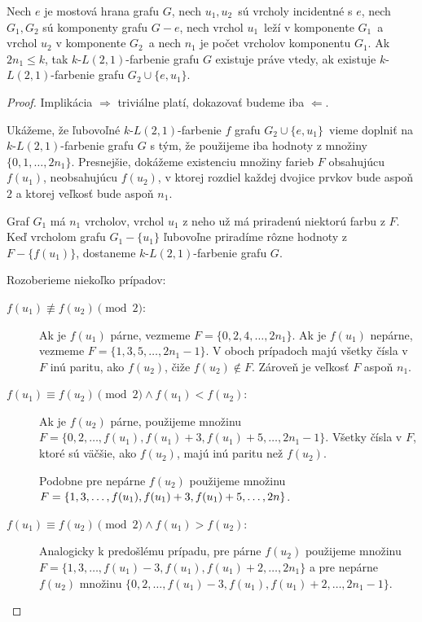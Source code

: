 \begin{lema}
    Nech $e$ je mostová hrana grafu $G$, nech $u_1, u_2$ sú vrcholy incidentné s $e$,
    nech $G_1, G_2$ sú komponenty grafu $G - e$, nech vrchol $u_1$ leží v komponente $G_1$ a vrchol $u_2$
    v komponente $G_2$ a
    nech $n_1$ je počet vrcholov komponentu $G_1$. Ak $2n_1 \leq k$, tak $k$-$L(2,1)$-farbenie
    grafu $G$ existuje práve vtedy, ak existuje $k$-$L(2,1)$-farbenie grafu $G_2 \cup \{e, u_1\}$.
\end{lema}

\begin{proof}
    Implikácia $\boxed{\Rightarrow}$ triviálne platí, dokazovať budeme iba $\boxed{\Leftarrow}$.

    Ukážeme, že ľubovoľné $k$-$L(2,1)$-farbenie $f$ grafu $G_2 \cup \{e, u_1\}$ vieme doplniť na
    $k$-$L(2,1)$-farbenie grafu $G$ s tým, že použijeme iba hodnoty z množiny $\{0, 1, \ldots, 2n_1\}$.
    Presnejšie, dokážeme existenciu množiny farieb $F$ obsahujúcu $f(u_1)$, neobsahujúcu $f(u_2)$,
    v ktorej rozdiel každej dvojice prvkov bude aspoň $2$ a ktorej veľkosť bude aspoň $n_1$.
    
    Graf $G_1$ má $n_1$ vrcholov, vrchol $u_1$ z neho už má priradenú niektorú farbu z $F$. Keď vrcholom
    grafu $G_1 - \{u_1\}$ ľubovoľne priradíme rôzne hodnoty z $F - \{f(u_1)\}$, dostaneme $k$-$L(2,1)$-farbenie
    grafu $G$.

    Rozoberieme niekoľko prípadov:

    \begin{description}
        \item[$\boxed{f(u_1) \not\equiv f(u_2) \pmod{2}}:$] 
            Ak je $f(u_1)$ párne, vezmeme $F = \{0, 2, 4, \ldots, 2n_1\}$.
            Ak je $f(u_1)$ nepárne, vezmeme $F = \{1, 3, 5, \ldots, 2n_1 - 1\}$. V oboch prípadoch majú všetky
            čísla v $F$ inú paritu, ako $f(u_2)$, čiže $f(u_2) \notin F$. Zároveň je veľkosť $F$ aspoň $n_1$.

        \item[$\boxed{f(u_1) \equiv f(u_2) \pmod{2} \wedge f(u_1) < f(u_2)}:$]
            Ak je $f(u_2)$ párne, použijeme množinu
            $F = \{0, 2, \ldots, f(u_1), f(u_1) + 3, f(u_1) + 5, \ldots, 2n_1 - 1\}$. Všetky čísla v $F$, ktoré sú
            väčšie, ako $f(u_2)$, majú inú paritu než $f(u_2)$.

            Podobne pre nepárne $f(u_2)$ použijeme množinu $F = \{1, 3, \ldots, f(u_1), f(u_1) + 3, \\ f(u_1) + 5, \ldots, 2n\}$.

        \item[$\boxed{f(u_1) \equiv f(u_2) \pmod{2} \wedge f(u_1) > f(u_2)}:$]
            Analogicky k predošlému prípadu, pre párne $f(u_2)$ použijeme množinu $F = \{1, 3, \ldots, f(u_1) - 3, f(u_1), f(u_1) + 2, \ldots, 2n_1\}$
            a pre nepárne $f(u_2)$ množinu $\{0, 2, \ldots, f(u_1) - 3, f(u_1), f(u_1) + 2, \ldots, 2n_1 - 1\}$. \qedhere
    \end{description}
\end{proof}


